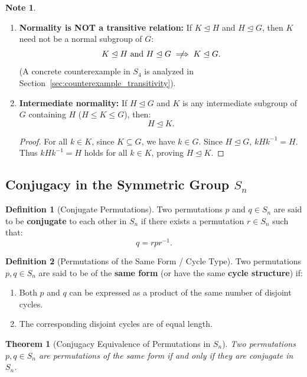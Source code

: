 \documentclass[12pt]{article}
\theoremstyle{definition}
\newtheorem{definition}{Definition}[section]
\newtheorem*{note}{Note}
\theoremstyle{plain}
\newtheorem{theorem}{Theorem}[section]
\begin{document}
\begin{note}
\begin{enumerate}
    \item \textbf{Normality is NOT a transitive relation:}
    If $K \trianglelefteq H$ and $H \trianglelefteq G$, then $K$ need not be a normal subgroup of $G$:
    \[
    K \trianglelefteq H \text{ and } H \trianglelefteq G \centernot\implies K \trianglelefteq G.
    \]
    (A concrete counterexample in $S_4$ is analyzed in Section~\ref{sec:counterexample_transitivity}).
    
    \item \textbf{Intermediate normality:}
    If $H \trianglelefteq G$ and $K$ is any intermediate subgroup of $G$ containing $H$ ($H \le K \le G$), then:
    \[
    H \trianglelefteq K.
    \]
    \begin{proof}
    For all $k \in K$, since $K \subseteq G$, we have $k \in G$. Since $H \trianglelefteq G$, $k H k^{-1} = H$. Thus $k H k^{-1} = H$ holds for all $k \in K$, proving $H \trianglelefteq K$.
    \end{proof}
\end{enumerate}
\end{note}

\subsection{Conjugacy in the Symmetric Group \texorpdfstring{$S_n$}{Sn}}

\begin{definition}[Conjugate Permutations]
Two permutations $p$ and $q \in S_n$ are said to be \textbf{conjugate} to each other in $S_n$ if there exists a permutation $r \in S_n$ such that:
\[
q = r p r^{-1}.
\]
\end{definition}

\begin{definition}[Permutations of the Same Form / Cycle Type]
Two permutations $p, q \in S_n$ are said to be of the \textbf{same form} (or have the same \textbf{cycle structure}) if:
\begin{enumerate}
    \item Both $p$ and $q$ can be expressed as a product of the same number of disjoint cycles.
    \item The corresponding disjoint cycles are of equal length.
\end{enumerate}
\end{definition}

\begin{theorem}[Conjugacy Equivalence of Permutations in $S_n$]
Two permutations $p, q \in S_n$ are permutations of the same form if and only if they are conjugate in $S_n$.
\end{theorem}
\end{document}

